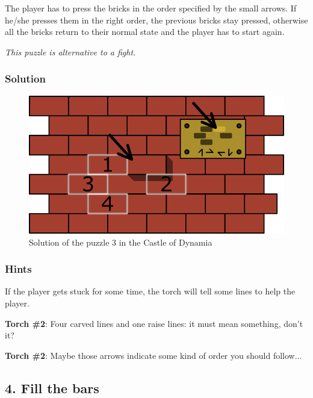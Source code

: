 The player has to press the bricks in the order specified by the small arrows. If he/she presses them in the right order, the previous bricks stay pressed, otherwise all the bricks return to their normal state and the player has to start again.

\textit{This puzzle is alternative to a fight.}

\subsubsection*{Solution}
\begin{figure}[H]
  \centering
  \includegraphics[width=\textwidth]{Images/Puzzles/castleOfDynamia3Solution}
  \caption{Solution of the puzzle 3 in the Castle of Dynamia}
\end{figure}

\subsubsection*{Hints}
If the player gets stuck for some time, the torch will tell some lines to help the player.

\textbf{Torch \#{}2}: Four carved lines and one raise lines: it must mean something, don't it?

\textbf{Torch \#{}2}: Maybe those arrows indicate some kind of order you should follow...



\subsection{4. Fill the bars}

